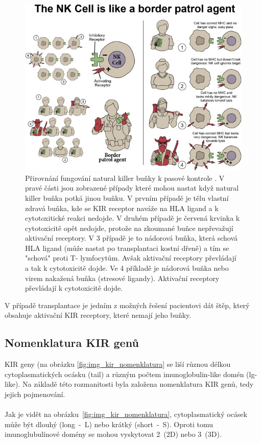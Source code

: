 \documentclass[czech,DP]{thesiskiv}
\begin{document}
\begin{figure}[H]		
		\centering
		\includegraphics[width=\textwidth]{./img/NK_princip.jpg}
		\caption{Přirovnání fungování natural killer buňky k pasové kontrole \cite{KIR_img_princip}. V pravé části jsou zobrazené případy které mohou nastat když natural killer buňka potká jinou buňku. V prvním případě je tělu vlastní zdravá buňka, kde se KIR receptor naváže na HLA ligand a k cytotoxitické reakci nedojde. V druhém případě je červená krvinka k cytotoxicitě opět nedojde, protože na zkoumané buňce nepřevažují aktivační receptory. V 3 případě je to nádorová buňka, která schová HLA ligand (může nastat po transplantaci kostní dřeně) a tím se "schová" proti T- lymfocytům. Avšak aktivační receptory převládají a tak k cytotoxicitě dojde. Ve 4 příkladě je nádorová buňka nebo virem nakažená buňka (stresové ligandy). Aktivační receptory převládají k cytotoxicitě dojde.}
		\label{fig:kir_princip}
\end{figure}

V případě transplantace je jedním z možných řešení pacientovi dát štěp, který obsahuje aktivační KIR receptory, které nemají jeho buňky.

\subsection{Nomenklatura KIR genů}
KIR geny (na obrázku \ref{fig:img_kir_nomenklatura} se liší různou délkou cytoplasmatických ocásku (tail) a různým počtem imunoglobulin-like domén (lg-like). Na základě této rozmanitosti byla založena nomenklatura KIR genů, tedy jejich pojmenování. 
\\
\\
Jak je vidět na obrázku~\ref{fig:img_kir_nomenklatura}, cytoplasmatický ocásek může být dlouhý (long~-~L) nebo krátký (short~-~S). Oproti tomu imunoglubulínové domény se mohou vyskytovat 2~(2D) nebo 3~(3D). 
\end{document}
